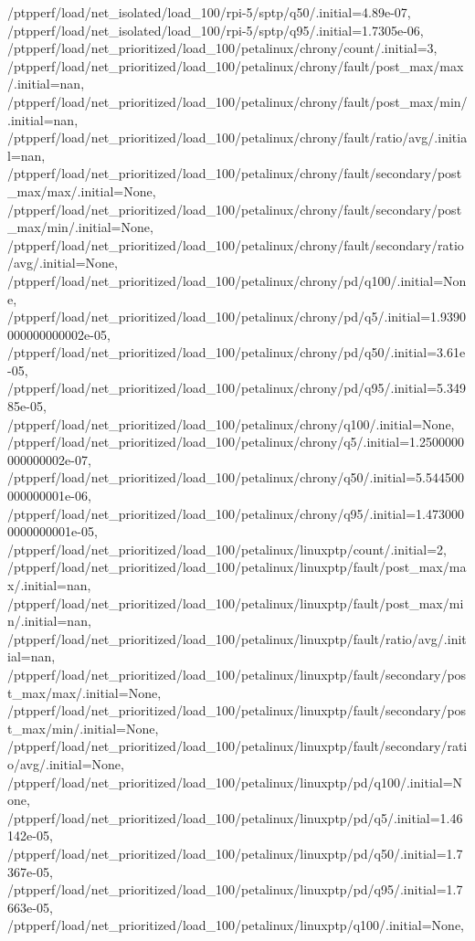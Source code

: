 {    /ptpperf/load/net_isolated/load_100/rpi-5/sptp/q50/.initial=4.89e-07,
    /ptpperf/load/net_isolated/load_100/rpi-5/sptp/q95/.initial=1.7305e-06,
    /ptpperf/load/net_prioritized/load_100/petalinux/chrony/count/.initial=3,
    /ptpperf/load/net_prioritized/load_100/petalinux/chrony/fault/post_max/max/.initial=nan,
    /ptpperf/load/net_prioritized/load_100/petalinux/chrony/fault/post_max/min/.initial=nan,
    /ptpperf/load/net_prioritized/load_100/petalinux/chrony/fault/ratio/avg/.initial=nan,
    /ptpperf/load/net_prioritized/load_100/petalinux/chrony/fault/secondary/post_max/max/.initial=None,
    /ptpperf/load/net_prioritized/load_100/petalinux/chrony/fault/secondary/post_max/min/.initial=None,
    /ptpperf/load/net_prioritized/load_100/petalinux/chrony/fault/secondary/ratio/avg/.initial=None,
    /ptpperf/load/net_prioritized/load_100/petalinux/chrony/pd/q100/.initial=None,
    /ptpperf/load/net_prioritized/load_100/petalinux/chrony/pd/q5/.initial=1.9390000000000002e-05,
    /ptpperf/load/net_prioritized/load_100/petalinux/chrony/pd/q50/.initial=3.61e-05,
    /ptpperf/load/net_prioritized/load_100/petalinux/chrony/pd/q95/.initial=5.34985e-05,
    /ptpperf/load/net_prioritized/load_100/petalinux/chrony/q100/.initial=None,
    /ptpperf/load/net_prioritized/load_100/petalinux/chrony/q5/.initial=1.2500000000000002e-07,
    /ptpperf/load/net_prioritized/load_100/petalinux/chrony/q50/.initial=5.544500000000001e-06,
    /ptpperf/load/net_prioritized/load_100/petalinux/chrony/q95/.initial=1.4730000000000001e-05,
    /ptpperf/load/net_prioritized/load_100/petalinux/linuxptp/count/.initial=2,
    /ptpperf/load/net_prioritized/load_100/petalinux/linuxptp/fault/post_max/max/.initial=nan,
    /ptpperf/load/net_prioritized/load_100/petalinux/linuxptp/fault/post_max/min/.initial=nan,
    /ptpperf/load/net_prioritized/load_100/petalinux/linuxptp/fault/ratio/avg/.initial=nan,
    /ptpperf/load/net_prioritized/load_100/petalinux/linuxptp/fault/secondary/post_max/max/.initial=None,
    /ptpperf/load/net_prioritized/load_100/petalinux/linuxptp/fault/secondary/post_max/min/.initial=None,
    /ptpperf/load/net_prioritized/load_100/petalinux/linuxptp/fault/secondary/ratio/avg/.initial=None,
    /ptpperf/load/net_prioritized/load_100/petalinux/linuxptp/pd/q100/.initial=None,
    /ptpperf/load/net_prioritized/load_100/petalinux/linuxptp/pd/q5/.initial=1.46142e-05,
    /ptpperf/load/net_prioritized/load_100/petalinux/linuxptp/pd/q50/.initial=1.7367e-05,
    /ptpperf/load/net_prioritized/load_100/petalinux/linuxptp/pd/q95/.initial=1.7663e-05,
    /ptpperf/load/net_prioritized/load_100/petalinux/linuxptp/q100/.initial=None,
}
